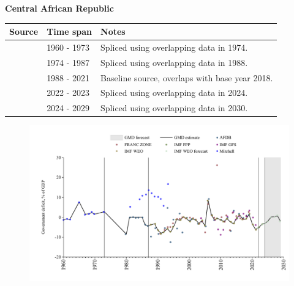 \documentclass[12pt,a4paper,landscape]{article}
\begin{document}
\begin{adjustbox}{max totalsize={\paperwidth}{\paperheight},center}
\begin{minipage}[t][\textheight][t]{\textwidth}
\vspace*{0.5cm}
{}
\begin{center}
{\Large\bfseries Central African Republic}
\end{center}
\vspace{0.5cm}
\begin{table}[H]
\centering
\small
\begin{tabular}{|l|l|l|}
\hline
\textbf{Source} & \textbf{Time span} & \textbf{Notes} \\
\hline
\rowcolor{white}\cite{Mitchell}& 1960 - 1973 &Spliced using overlapping data in 1974.\\
\rowcolor{lightgray}\cite{AFDB}& 1974 - 1987 &Spliced using overlapping data in 1988.\\
\rowcolor{white}\cite{IMF_WEO}& 1988 - 2021 &Baseline source, overlaps with base year 2018.\\
\rowcolor{lightgray}\cite{IMF_FPP}& 2022 - 2023 &Spliced using overlapping data in 2024.\\
\rowcolor{white}\cite{IMF_WEO_forecast}& 2024 - 2029 &Spliced using overlapping data in 2030.\\
\hline
\end{tabular}
\end{table}
\begin{figure}[H]
\centering
\includegraphics[width=\textwidth,height=0.6\textheight,keepaspectratio]{graphs/CAF_govdef_GDP.pdf}
\end{figure}
\end{minipage}
\end{adjustbox}
\end{document}
